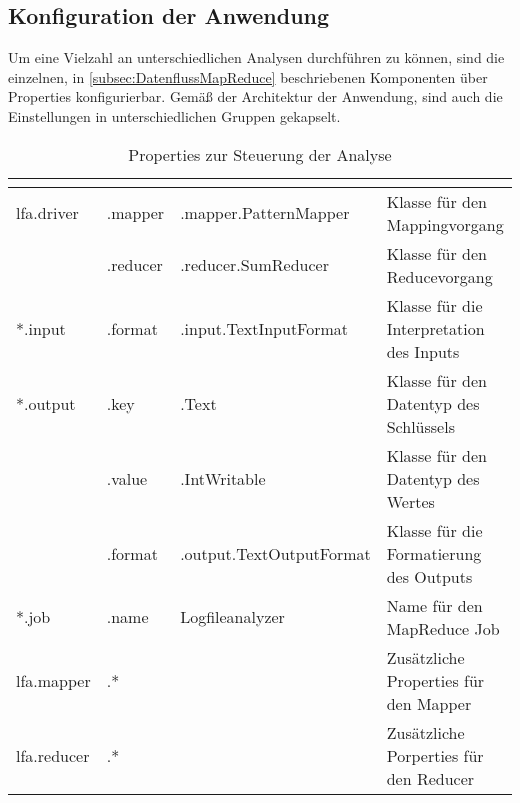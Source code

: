
\subsection{Konfiguration der Anwendung}
Um eine Vielzahl an unterschiedlichen Analysen durchführen zu können, sind die einzelnen, in \autoref{subsec:DatenflussMapReduce} beschriebenen Komponenten über Properties konfigurierbar. Gemäß der Architektur der Anwendung, sind auch die Einstellungen in unterschiedlichen Gruppen gekapselt.

\begin{table}[h]
	\centering
	\begin{tabularx}{\textwidth}{| l | l | l | X |}
		\hline
		\rowcolor[HTML]{3531FF} 
		\multicolumn{1}{l|}{\cellcolor[HTML]{4F88BB}{\color[HTML]{FFFFFF} {\bf Gruppe}}} &
		\multicolumn{1}{l|}{\cellcolor[HTML]{4F88BB}{\color[HTML]{FFFFFF} {\bf Property}}} &
		\multicolumn{1}{l|}{\cellcolor[HTML]{4F88BB}{\color[HTML]{FFFFFF} {\bf Standardwert}}} & \multicolumn{1}{l|}{\cellcolor[HTML]{4F88BB}{\color[HTML]{FFFFFF} {\bf Beschreibung}}} \\ \hline
		lfa.driver & .mapper & \footnotemark[1].mapper.PatternMapper & Klasse für den Mappingvorgang \\ \cline{2-4}
		 & .reducer & \footnotemark[1].reducer.SumReducer & Klasse für den Reducevorgang \\ \hline
		*.input & .format & \footnotemark[2].input.TextInputFormat & Klasse für die Interpretation des Inputs \\ \hline
		*.output & .key & \footnotemark[3].Text & Klasse für den Datentyp des Schlüssels \\ \cline{2-4}
		 & .value & \footnotemark[3].IntWritable & Klasse für den Datentyp des Wertes \\ \cline{2-4}
		 & .format & \footnotemark[2].output.TextOutputFormat & Klasse für die Formatierung des Outputs \\ \hline
		*.job & .name & Logfileanalyzer & Name für den MapReduce Job \\ \hline
		lfa.mapper & .* &  & Zusätzliche Properties für den Mapper \\ \hline
		lfa.reducer & .* &  & Zusätzliche Porperties für den Reducer \\ \hline
	\end{tabularx}
	\caption{Properties zur Steuerung der Analyse}
	\label{tbl:AppProperties}
\end{table}

